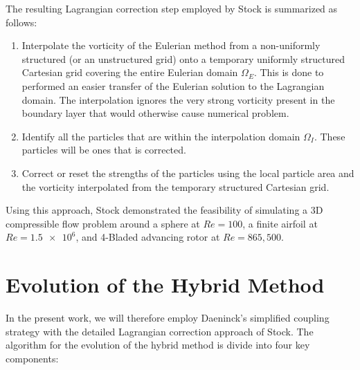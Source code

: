 	The resulting Lagrangian correction step employed by Stock is summarized as follows:
	
	\begin{enumerate}
	\item Interpolate the vorticity of the Eulerian method from a non-uniformly structured (or an unstructured grid) onto a temporary uniformly structured Cartesian grid covering the entire Eulerian domain $\Omega_E$. This is done to performed an easier transfer of the Eulerian solution to the Lagrangian domain. The interpolation ignores the very strong vorticity present in the boundary layer that would otherwise cause numerical problem.
	
	\item Identify all the particles that are within the interpolation domain $\Omega_I$. These particles will be ones that is corrected.
	
	\item Correct or reset the strengths of the particles using the local particle area and the vorticity interpolated from the temporary structured Cartesian grid.
	\end{enumerate}
	
	Using this approach, Stock demonstrated the feasibility of simulating a 3D compressible flow problem around a sphere at $Re=100$, a finite airfoil at $Re=\num{1.5e6}$, and 4-Bladed advancing rotor at $Re=865,500$.
	
	\section{Evolution of the Hybrid Method}

	In the present work, we will therefore employ Daeninck's simplified coupling strategy with the detailed Lagrangian correction approach of Stock. The algorithm for the evolution of the hybrid method is divide into four key components:

